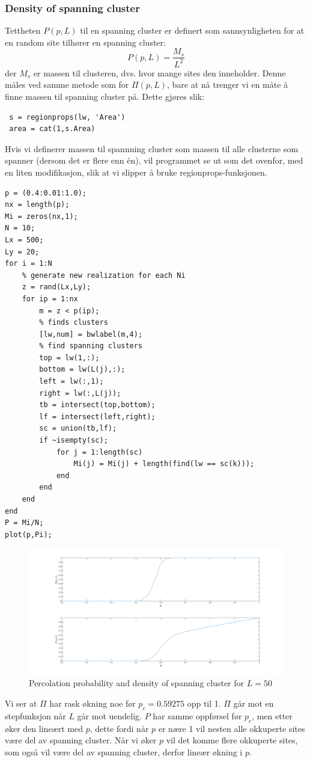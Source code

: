 \documentclass[english, a4paper]{article}
\begin{document}
\subsubsection{Density of spanning cluster}
Tettheten $P(p,L)$ til en spanning cluster er definert som sannsynligheten for at en random site
tilhører en spanning cluster:
\begin{equation}
 P(p,L) = \frac{M_s}{L^2}
\end{equation}
der $M_s$ er massen til clusteren, dvs. hvor mange sites den inneholder. Denne måles ved samme
metode som for $\Pi(p,L)$, bare at nå trenger vi en måte å finne massen til spanning cluster på. 
Dette gjøres slik:
\begin{lstlisting}
 s = regionprops(lw, 'Area')
 area = cat(1,s.Area)
\end{lstlisting}
Hvis vi definerer massen til spannning cluster som massen til alle clusterne som spanner (dersom det 
er flere enn én), vil programmet se ut som det ovenfor, med en liten modifikasjon, slik at 
vi slipper å bruke regionprops-funksjonen. 
\begin{lstlisting}
p = (0.4:0.01:1.0);
nx = length(p);
Mi = zeros(nx,1);
N = 10;
Lx = 500;
Ly = 20;
for i = 1:N
    % generate new realization for each Ni
    z = rand(Lx,Ly);
    for ip = 1:nx
        m = z < p(ip);
        % finds clusters
        [lw,num] = bwlabel(m,4);
        % find spanning clusters
        top = lw(1,:);
        bottom = lw(L(j),:);
        left = lw(:,1);
        right = lw(:,L(j));
        tb = intersect(top,bottom);
        lf = intersect(left,right);
        sc = union(tb,lf);
        if ~isempty(sc);
            for j = 1:length(sc)
                Mi(j) = Mi(j) + length(find(lw == sc(k)));
            end
        end
    end
end
P = Mi/N;
plot(p,Pi);
\end{lstlisting}
\begin{figure}[H]
  \begin{center}
  \includegraphics[width = 140mm]{../Figures/PiAndPL50.png}
  \caption{Percolation probability and density of spanning cluster for $L=50$}
  \label{fig:fig7}
  \end{center}
\end{figure}
Vi ser at $\Pi$ har rask økning noe før $p_c = 0.59275$ opp til 1. $\Pi$ går mot en stepfunksjon
når $L$ går mot uendelig. $P$ har samme oppførsel før $p_c$, men etter øker den lineært med $p$, dette
fordi når $p$ er nære 1 vil nesten alle okkuperte sites være del av spanning cluster. Når vi øker $p$
vil det komme flere okkuperte sites, som også vil være del av spanning cluster, derfor lineær økning i $p$. 
\end{document}
